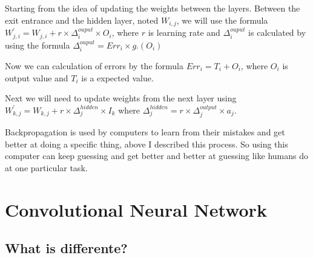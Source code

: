 Starting from the idea of updating the weights between the layers. 
Between the exit entrance and the hidden layer, noted $W_{i,j}$,  we will use the formula 
$W^{'}_{j,i} = W_{j,i} + r \times \Delta_i^{ouput} \times O_i$, where $r$ is learning rate 
and $\Delta_i^{ouput}$ is calculated by using the formula $\Delta_i^{ouput} = Err_i  \times g_{'}(O_i)$

Now we can calculation of errors by the formula $Err_i = T_i + O_i$, where $O_i$ is output value and $T_i$ is a expected value.

Next we will need to update weights from the next layer using $W^{'}_{k,j} = W_{k,j} + r \times \Delta_j^{hidden} \times I_k$ where 
$\Delta_j^{hidden} = r  \times \Delta_j^{output} \times  a_j$.

Backpropagation is used by computers to learn from their mistakes and 
get better at doing a specific thing, above I described this process.
So using this computer can keep guessing and
get better and better at guessing like humans do at one particular task.


\section{Convolutional Neural Network}
\subsection{What is differente?}


